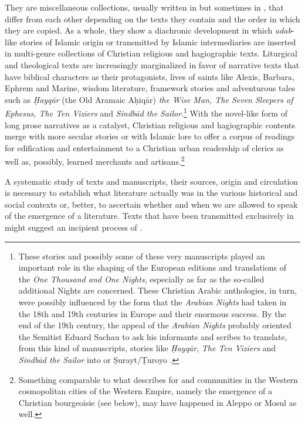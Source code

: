 \documentclass[output=paper,colorlinks,citecolor=brown,arabfont,syriacfont]{langscibook}
\begin{document}
\largerpage
They are miscellaneous collections, usually written in   but sometimes in , that differ from each other depending on the texts they contain and the order in which they are copied. As a whole, they show a diachronic development in which \textit{adab}-like stories of Islamic origin or transmitted by Islamic intermediaries are inserted in multi-genre collections of Christian religious and hagiographic texts. Liturgical and theological texts are increasingly marginalized in favor of narrative texts that have biblical characters as their protagonists, lives of saints like Alexis, Barbara, Ephrem and Marine, wisdom literature, framework stories and adventurous tales such as \textit{Ḥayqār} (the Old Aramaic Aḥiqār) \textit{the Wise Man, The Seven Sleepers of Ephesus, The Ten Viziers} and \textit{Sindbād the Sailor}.\footnote{%
These stories and possibly some of these very manuscripts played an important role in the shaping of the European editions and translations of the \textit{One Thousand and One Nights}, especially as far as the so-called additional Nights are concerned. These Christian Arabic anthologies, in turn, were possibly influenced by the form that the \textit{Arabian Nights} had taken in the 18th and 19th centuries in Europe and their enormous success. By the end of the 19th century, the appeal of the \textit{Arabian Nights} probably oriented the  Semitist Eduard Sachau to ask his informants and scribes to translate, from this kind of  manuscripts, stories like \textit{Ḥayqār}, \textit{The Ten Viziers} and \textit{Sindbād the Sailor} into  or Ṣurayt/Ṭuroyo  \citep{bellino_mengozzi2016,mengozzi2023a}.} With the novel-like form of long prose narratives as a catalyst, Christian religious and hagiographic contents merge with more secular stories or with Islamic lore to offer a corpus of readings for edification and entertainment to a Christian urban readership of clerics as well as, possibly, learned merchants and artisans.\footnote{%
Something comparable to what \citet[11]{leezenberg2021} describes for  and  communities in the Western cosmopolitan cities of the Western  Empire, namely the emergence of a Christian bourgeoisie (see below), may have happened in Aleppo or Mosul as well. }


A systematic study of  texts and manuscripts, their sources, origin and circulation is necessary to establish what  literature actually was in the various historical and social contexts or, better, to ascertain whether and when we are allowed to speak of the emergence of a  literature. Texts that have been transmitted exclusively in  might suggest an incipient process of .
\end{document}

